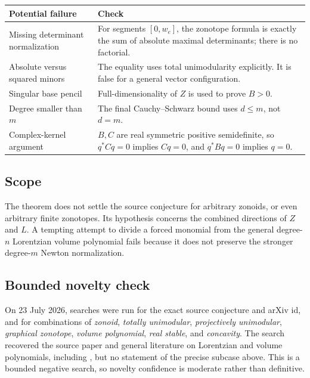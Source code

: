 \documentclass[11pt]{article}
\theoremstyle{definition}
\begin{document}
\begin{center}
\begin{tabular}{@{}>{\raggedright\arraybackslash}p{}
>{\raggedright\arraybackslash}p{}@{}}
\toprule
Potential failure & Check \\
\midrule
Missing determinant normalization &
For segments \([0,w_e]\), the zonotope formula is exactly the sum of absolute
maximal determinants; there is no factorial. \\
Absolute versus squared minors &
The equality uses total unimodularity explicitly.  It is false for a general
vector configuration. \\
Singular base pencil &
Full-dimensionality of \(Z\) is used to prove \(B>0\). \\
Degree smaller than \(m\) &
The final Cauchy--Schwarz bound uses \(d\leq m\), not \(d=m\). \\
Complex-kernel argument &
\(B,C\) are real symmetric positive semidefinite, so \(q^*Cq=0\) implies
\(Cq=0\), and \(q^*Bq=0\) implies \(q=0\). \\
\bottomrule
\end{tabular}
\end{center}

\subsection*{Scope}

The theorem does not settle the source conjecture for arbitrary zonoids, or
even arbitrary finite zonotopes.  Its hypothesis concerns the combined
directions of \(Z\) and \(L\).  A tempting attempt to divide a forced monomial
from the general degree-\(n\) Lorentzian volume polynomial fails because it
does not preserve the stronger degree-\(m\) Newton normalization.

\subsection*{Bounded novelty check}

On 23 July 2026, searches were run for the exact source conjecture and arXiv
id, and for combinations of \emph{zonoid}, \emph{totally unimodular},
\emph{projectively unimodular}, \emph{graphical zonotope},
\emph{volume polynomial}, \emph{real stable}, and \emph{concavity}.
The search recovered the source paper and general literature on Lorentzian
and volume polynomials, including \cite{BH}, but no statement of the precise
subcase above.  This is a bounded negative search, so novelty confidence is
moderate rather than definitive.
\end{document}
